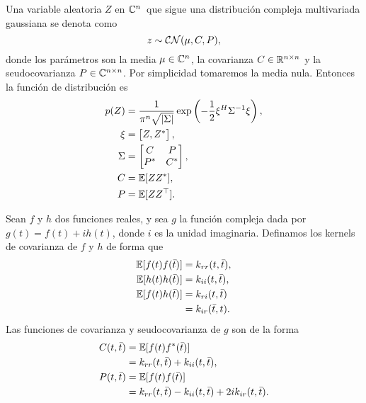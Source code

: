 \begin{definition}
	Una variable aleatoria \(Z\) en \(\mathbb{C}^{n}\)\ que sigue una distribución compleja multivariada gaussiana se denota como
	\begin{equation*}
		z\sim \operatorname{\mathcal{CN}}(\mu, C, P),
	\end{equation*}
	donde los parámetros son la media \(\mu \in \mathbb{C}^{n}\), la covarianza \(C \in \mathbb{R}^{n \times n}\) y la seudocovarianza \(P \in \mathbb{C}^{n\times n}\). Por simplicidad tomaremos la media nula. Entonces la función de distribución es
	\begin{align*}
		p(Z)	&= \frac{1}{\pi^{n} \sqrt{\vert \Sigma \vert }} \exp \left(-\frac{1}{2} \xi^{H} \Sigma^{-1} \xi \right), \\
		\xi		&= \begin{bmatrix} Z, Z^\ast\end{bmatrix},\\
		\Sigma	&= \begin{bmatrix} C & P \\ P^\ast & C^\ast \end{bmatrix},\\
		C		&= \mathbb{E}[ZZ^\ast],\\
		P		&= \mathbb{E}[ZZ^{\top}].
	\end{align*}
\end{definition}

\begin{proposition}
	Sean \(f\) y \(h\) dos funciones reales, y sea \(g\) la función compleja dada por \(g(t) = f(t) +ih(t)\), donde \(i\) es la unidad imaginaria. Definamos los kernels de covarianza de \(f\) y \(h\) de forma que
	\begin{align*}
		\mathbb{E}[f(t) f(\bar{t})]	&= k_{rr}(t, \bar{t}),\\
		\mathbb{E}[h(t) h(\bar{t})]	&= k_{ii}(t, \bar{t}),\\
		\mathbb{E}[f(t) h(\bar{t})]	&= k_{ri}(t, \bar{t})\\
								&= k_{ir}(\bar{t}, t).
	\end{align*}
	Las funciones de covarianza y seudocovarianza de \(g\) son de la forma
	\begin{align*}
	C(t, \bar{t})	&= \mathbb{E}[f(t) f^{\ast }(\bar{t})] \\
					&= k_{rr}(t, \bar{t}) +k_{ii} (t, \bar{t}),\\
	P(t, \bar{t})	&= \mathbb{E}[f(t) f(\bar{t})]\\
					&= k_{rr}(t, \bar{t}) - k_{ii}(t, \bar{t}) + 2 i k_{ir}(t, \bar{t}).
	\end{align*}
\end{proposition}

